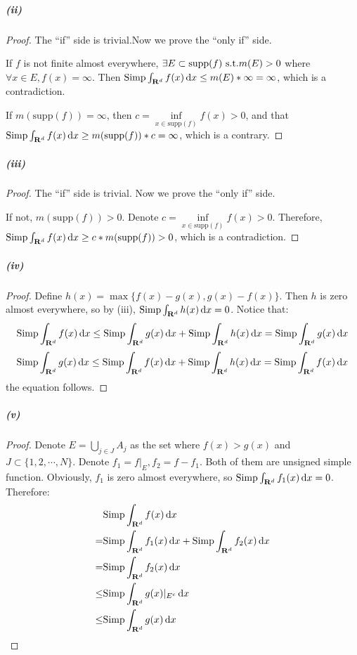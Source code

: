 \documentclass{article}
\begin{document}
\newcommand{\supp}{\mathrm{supp}}
\subparagraph{(ii)}
\begin{proof}
The ``if'' side is trivial.Now we prove the ``only if'' side. 

If $f$ is not finite almost everywhere, $\exists E\subset \supp(f)\st m(E)>0$ where $\forall x\in E, f(x)=\infty$. Then $\mathrm{Simp}\int_{\mathbf{R}^d}f(x)\,\mathrm{d} x\leq m(E)*\infty=\infty$, which is a contradiction.

If $m(\supp(f))=\infty$, then $c=\inf\limits_{x\in\supp(f)}f(x)>0$, and that $\sip\int_{\mathbf{R}^d}f(x)\dd x\geq m(\supp(f))*c=\infty$, which is a contrary.

\end{proof}

\subparagraph{(iii)}
\begin{proof}
The ``if'' side is trivial. Now we prove the ``only if'' side.

If not, $m(\supp(f))>0$. Denote $c=\inf\limits_{x\in\supp(f)}f(x)>0$. Therefore, $\sip\int_{\mathbf{R}^d}f(x)\dd x\geq c*m(\supp(f))>0$, which is a contradiction.
\end{proof}

\subparagraph{(iv)}
\begin{proof}
Define $h(x)=\max\{f(x)-g(x),g(x)-f(x)\}$. Then $h$ is zero almost everywhere, so by (iii), $\mathrm{Simp}\int_{\mathbf{R}^d}h(x)\,\mathrm{d} x=0$. Notice that:
\[\mathrm{Simp}\int_{\mathbf{R}^d}f(x)\,\mathrm{d} x\leq \mathrm{Simp}\int_{\mathbf{R}^d}g(x)\,\mathrm{d} x+\mathrm{Simp}\int_{\mathbf{R}^d}h(x)\,\mathrm{d} x=\mathrm{Simp}\int_{\mathbf{R}^d}g(x)\,\mathrm{d} x\]
\[\mathrm{Simp}\int_{\mathbf{R}^d}g(x)\,\mathrm{d} x\leq \mathrm{Simp}\int_{\mathbf{R}^d}f(x)\,\mathrm{d} x+\mathrm{Simp}\int_{\mathbf{R}^d}h(x)\,\mathrm{d} x=\mathrm{Simp}\int_{\mathbf{R}^d}f(x)\,\mathrm{d} x\]
the equation follows.
\end{proof}

\subparagraph{(v)}
\begin{proof}
Denote $E=\bigcup\limits_{j\in J}A_j$ as the set where $f(x)>g(x)$ and $J\subset \{1,2,\cdots,N\}$. Denote $f_1=f|_{E}, f_2=f-f_1$. Both of them are unsigned simple function. Obviously, $f_1$ is zero almost everywhere, so $\mathrm{Simp}\int_{\mathbf{R}^d}f_1(x)\,\mathrm{d} x=0$. Therefore:
\[\begin{aligned}
&\mathrm{Simp}\int_{\mathbf{R}^d}f(x)\,\mathrm{d} x\\
=&\mathrm{Simp}\int_{\mathbf{R}^d}f_1(x)\,\mathrm{d} x+\mathrm{Simp}\int_{\mathbf{R}^d}f_2(x)\,\mathrm{d} x\\
=&\mathrm{Simp}\int_{\mathbf{R}^d}f_2(x)\,\mathrm{d} x\\
\leq &\mathrm{Simp}\int_{\mathbf{R}^d}g(x)|_{E^c}\,\mathrm{d} x\\
\leq &\mathrm{Simp}\int_{\mathbf{R}^d}g(x)\,\mathrm{d} x
\end{aligned}
\]
\end{proof}
\end{document}
